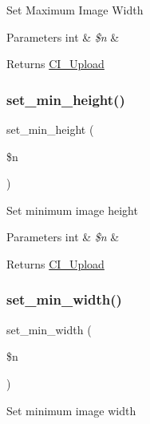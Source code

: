 Set Maximum Image Width


\begin{DoxyParams}[1]{Parameters}
int & {\em \$n} & \\
\hline
\end{DoxyParams}
\begin{DoxyReturn}{Returns}
\mbox{\hyperlink{class_c_i___upload}{C\+I\+\_\+\+Upload}} 
\end{DoxyReturn}
\mbox{\label{class_c_i___upload_a72c6007605b27c92dfd83c6e21fe82e3}} 
\subsubsection{\texorpdfstring{set\+\_\+min\+\_\+height()}{set\_min\_height()}}
{\footnotesize\ttfamily set\+\_\+min\+\_\+height (\begin{DoxyParamCaption}\item[{}]{\$n }\end{DoxyParamCaption})}

Set minimum image height


\begin{DoxyParams}[1]{Parameters}
int & {\em \$n} & \\
\hline
\end{DoxyParams}
\begin{DoxyReturn}{Returns}
\mbox{\hyperlink{class_c_i___upload}{C\+I\+\_\+\+Upload}} 
\end{DoxyReturn}
\mbox{\label{class_c_i___upload_afe47751e024dc9bf07333060628e0fb4}} 
\subsubsection{\texorpdfstring{set\+\_\+min\+\_\+width()}{set\_min\_width()}}
{\footnotesize\ttfamily set\+\_\+min\+\_\+width (\begin{DoxyParamCaption}\item[{}]{\$n }\end{DoxyParamCaption})}

Set minimum image width


